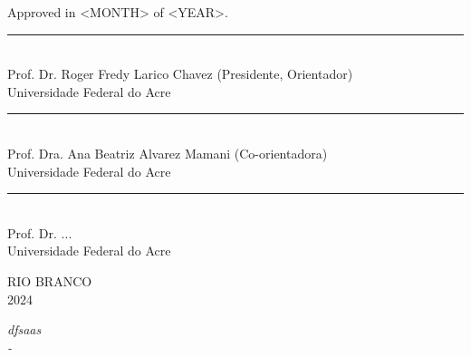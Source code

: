 	Approved in <MONTH> of <YEAR>. \\
	\begin{flushright}
	  \parbox{11cm}
	  {
	    \begin{center}
	      \vspace{3mm}
	      \rule{11cm}{.1mm} \\
	      Prof. Dr. Roger Fredy Larico Chavez (Presidente, Orientador)\\
	      Universidade Federal do Acre
	      \vspace{3mm}
	    \end{center}
     
     \begin{center}
	      \vspace{3mm}
	      \rule{11cm}{.1mm} \\
	      Prof. Dra. Ana Beatriz Alvarez Mamani (Co-orientadora)\\
	      Universidade Federal do Acre
	      \vspace{3mm}
	    \end{center}
     
     \begin{center}
	      \vspace{3mm}
	      \rule{11cm}{.1mm} \\
	      Prof. Dr. ...\\
	      Universidade Federal do Acre
	      \vspace{3mm}
	    \end{center}
	  }
	\end{flushright}
	
	\begin{center}
	  \vspace{4mm}
	  RIO BRANCO \\
	  2024
	\end{center}
	
	\cleardoublepage
	\thispagestyle{empty}
	\vspace*{200mm}
	
	\begin{flushright}
	  {\em
	dfsaas
	    \\
	   - 
	    \\ 
	    
	  }
	\end{flushright}
	\newpage
	
